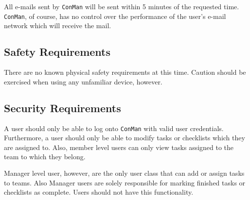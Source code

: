 \documentclass{article}
\begin{document}
All e-mails sent by \texttt{ConMan} will be sent within 5 minutes of the requested time.
\texttt{ConMan}, of course, has no control over the performance of the user's e-mail network which will receive the mail.


\subsection{Safety Requirements}
There are no known physical safety requirements at this time.  Caution should be exercised when using any unfamiliar device, however.\\

\subsection{Security Requirements}
A user should only be able to log onto \texttt{ConMan} with valid user credentials.
Furthermore, a user should only be able to modify tasks or checklists which they are assigned to.
Also, member level users can only view tasks assigned to the team to which they belong.

Manager level user, however, are the only user class that can add or assign tasks to teams.  Also Manager users are solely responsible for marking finished tasks or checklists as complete.  Users should not have this functionality.
\end{document}
